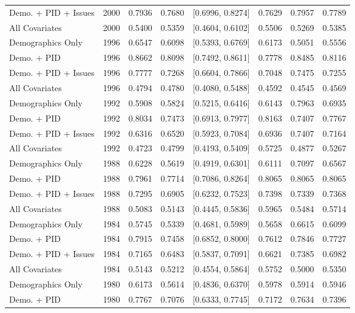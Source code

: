 \begin{longtable}{lrrrlrrr}
  Demo. + PID + Issues & 2000 & 0.7936 & 0.7680 & [0.6996, 0.8274] & 0.7629 & 0.7957 & 0.7789 \\ 
  All Covariates & 2000 & 0.5400 & 0.5359 & [0.4604, 0.6102] & 0.5506 & 0.5269 & 0.5385 \\ 
  Demographics Only & 1996 & 0.6547 & 0.6098 & [0.5393, 0.6769] & 0.6173 & 0.5051 & 0.5556 \\ 
  Demo. + PID & 1996 & 0.8662 & 0.8098 & [0.7492, 0.8611] & 0.7778 & 0.8485 & 0.8116 \\ 
  Demo. + PID + Issues & 1996 & 0.7777 & 0.7268 & [0.6604, 0.7866] & 0.7048 & 0.7475 & 0.7255 \\ 
  All Covariates & 1996 & 0.4794 & 0.4780 & [0.4080, 0.5488] & 0.4592 & 0.4545 & 0.4569 \\ 
  Demographics Only & 1992 & 0.5908 & 0.5824 & [0.5215, 0.6416] & 0.6143 & 0.7963 & 0.6935 \\ 
  Demo. + PID & 1992 & 0.8034 & 0.7473 & [0.6913, 0.7977] & 0.8163 & 0.7407 & 0.7767 \\ 
  Demo. + PID + Issues & 1992 & 0.6316 & 0.6520 & [0.5923, 0.7084] & 0.6936 & 0.7407 & 0.7164 \\ 
  All Covariates & 1992 & 0.4723 & 0.4799 & [0.4193, 0.5409] & 0.5725 & 0.4877 & 0.5267 \\ 
  Demographics Only & 1988 & 0.6228 & 0.5619 & [0.4919, 0.6301] & 0.6111 & 0.7097 & 0.6567 \\ 
  Demo. + PID & 1988 & 0.7961 & 0.7714 & [0.7086, 0.8264] & 0.8065 & 0.8065 & 0.8065 \\ 
  Demo. + PID + Issues & 1988 & 0.7295 & 0.6905 & [0.6232, 0.7523] & 0.7398 & 0.7339 & 0.7368 \\ 
  All Covariates & 1988 & 0.5083 & 0.5143 & [0.4445, 0.5836] & 0.5965 & 0.5484 & 0.5714 \\ 
  Demographics Only & 1984 & 0.5745 & 0.5339 & [0.4681, 0.5989] & 0.5658 & 0.6615 & 0.6099 \\ 
  Demo. + PID & 1984 & 0.7915 & 0.7458 & [0.6852, 0.8000] & 0.7612 & 0.7846 & 0.7727 \\ 
  Demo. + PID + Issues & 1984 & 0.7165 & 0.6483 & [0.5837, 0.7091] & 0.6621 & 0.7385 & 0.6982 \\ 
  All Covariates & 1984 & 0.5143 & 0.5212 & [0.4554, 0.5864] & 0.5752 & 0.5000 & 0.5350 \\ 
  Demographics Only & 1980 & 0.6173 & 0.5614 & [0.4836, 0.6370] & 0.5978 & 0.5914 & 0.5946 \\ 
  Demo. + PID & 1980 & 0.7767 & 0.7076 & [0.6333, 0.7745] & 0.7172 & 0.7634 & 0.7396 \\ 

\end{longtable}
